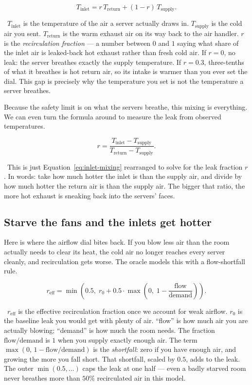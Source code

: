 \documentclass[11pt]{report}
\newcommand{\plainwords}[1]{\par\smallskip\noindent{\itshape In plain words.}~#1\par\smallskip}
\begin{document}
\begin{equation}\label{eq:inlet-mixing}
T_{\text{inlet}} = r\,T_{\text{return}} + (1-r)\,T_{\text{supply}}.
\end{equation}
\plainwords{$T_{\text{inlet}}$ is the temperature of the air a server actually draws in. $T_{\text{supply}}$ is the cold air you sent. $T_{\text{return}}$ is the warm exhaust air on its way back to the air handler. $r$ is the \emph{recirculation fraction} --- a number between $0$ and $1$ saying what share of the inlet air is leaked-back hot exhaust rather than fresh cold air. If $r=0$, no leak: the server breathes exactly the supply temperature. If $r=0.3$, three-tenths of what it breathes is hot return air, so its intake is warmer than you ever set the dial. This gap is precisely why the temperature you set is not the temperature a server breathes.}

Because the safety limit is on what the servers breathe, this mixing is everything. We can even turn the formula around to measure the leak from observed temperatures.

\begin{equation}\label{eq:recirc-solve}
r = \frac{T_{\text{inlet}} - T_{\text{supply}}}{T_{\text{return}} - T_{\text{supply}}}.
\end{equation}
\plainwords{This is just Equation~\ref{eq:inlet-mixing} rearranged to solve for the leak fraction $r$. In words: take how much hotter the inlet is than the supply air, and divide by how much hotter the return air is than the supply air. The bigger that ratio, the more hot exhaust is sneaking back into the servers' faces.}

\subsection*{Starve the fans and the inlets get hotter}

Here is where the airflow dial bites back. If you blow less air than the room actually needs to clear its heat, the cold air no longer reaches every server cleanly, and recirculation gets worse. The oracle models this with a flow-shortfall rule.

\begin{equation}\label{eq:recirc-flow}
r_{\text{eff}} = \min\!\left(0.5,\; r_0 + 0.5 \cdot \max\!\left(0,\; 1 - \frac{\text{flow}}{\text{demand}}\right)\right).
\end{equation}
\plainwords{$r_{\text{eff}}$ is the effective recirculation fraction once we account for weak airflow. $r_0$ is the baseline leak you would get with plenty of air. ``flow'' is how much air you are actually blowing; ``demand'' is how much the room needs. The fraction $\text{flow}/\text{demand}$ is $1$ when you supply exactly enough air. The term $\max(0,\,1 - \text{flow}/\text{demand})$ is the \emph{shortfall}: zero if you have enough air, and growing the more you fall short. That shortfall, scaled by $0.5$, adds to the leak. The outer $\min(0.5,\dots)$ caps the leak at one half --- even a badly starved room never breathes more than $50\%$ recirculated air in this model.}
\end{document}
